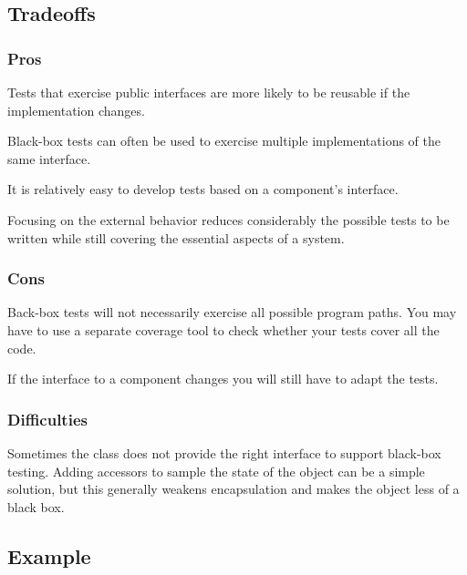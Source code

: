 \documentclass[a4paper,10pt,twoside]{book}
\begin{document}
\subsection*{Tradeoffs}

\subsubsection*{Pros}

\begin{bulletlist}
\item Tests that exercise public interfaces are more likely to be reusable if the implementation changes.
\item Black-box tests can often be used to exercise multiple implementations of the same interface.
\item It is relatively easy to develop tests based on a component's interface.
\item Focusing on the external behavior reduces considerably the possible tests to be written while still covering the essential aspects of a system.
\end{bulletlist}

\subsubsection*{Cons}

\begin{bulletlist}
\item Back-box tests will not necessarily exercise all possible program paths. You may have to use a separate coverage tool to check whether your tests cover all the code.
\item If the interface to a component changes you will still have to adapt the tests.
\end{bulletlist}

\subsubsection*{Difficulties}

\begin{bulletlist}
\item Sometimes the class does not provide the right interface to support black-box testing. Adding accessors to sample the state of the object can be a simple solution, but this generally weakens encapsulation and makes the object less of a black box.
\end{bulletlist}

\subsection*{Example}
\end{document}
